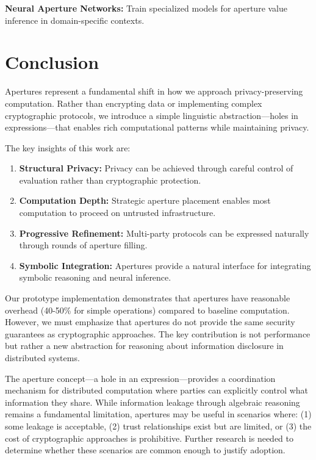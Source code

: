 \documentclass[12pt]{article}
\begin{document}
\textbf{Neural Aperture Networks:} Train specialized models for aperture value inference in domain-specific contexts.

\section{Conclusion}

Apertures represent a fundamental shift in how we approach privacy-preserving computation. Rather than encrypting data or implementing complex cryptographic protocols, we introduce a simple linguistic abstraction—holes in expressions—that enables rich computational patterns while maintaining privacy.

The key insights of this work are:

\begin{enumerate}
    \item \textbf{Structural Privacy:} Privacy can be achieved through careful control of evaluation rather than cryptographic protection.
    
    \item \textbf{Computation Depth:} Strategic aperture placement enables most computation to proceed on untrusted infrastructure.
    
    \item \textbf{Progressive Refinement:} Multi-party protocols can be expressed naturally through rounds of aperture filling.
    
    \item \textbf{Symbolic Integration:} Apertures provide a natural interface for integrating symbolic reasoning and neural inference.
\end{enumerate}

Our prototype implementation demonstrates that apertures have reasonable overhead (40-50\% for simple operations) compared to baseline computation. However, we must emphasize that apertures do not provide the same security guarantees as cryptographic approaches. The key contribution is not performance but rather a new abstraction for reasoning about information disclosure in distributed systems.

The aperture concept—a hole in an expression—provides a coordination mechanism for distributed computation where parties can explicitly control what information they share. While information leakage through algebraic reasoning remains a fundamental limitation, apertures may be useful in scenarios where: (1) some leakage is acceptable, (2) trust relationships exist but are limited, or (3) the cost of cryptographic approaches is prohibitive. Further research is needed to determine whether these scenarios are common enough to justify adoption.
\end{document}
